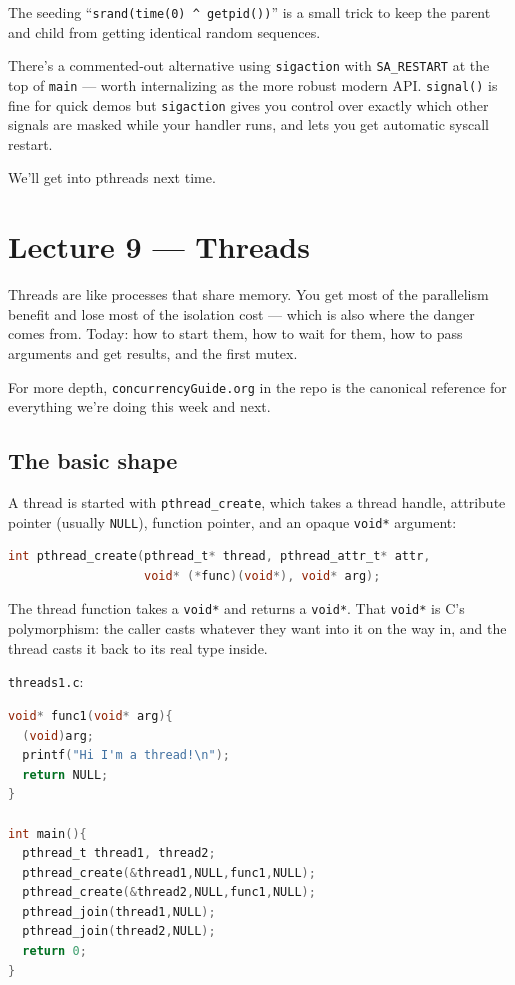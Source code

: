 \documentclass[11pt]{article}
\begin{document}
The seeding ``\texttt{srand(time(0) \^{} getpid())}'' is a small
trick to keep the parent and child from getting identical random
sequences.

There's a commented-out alternative using \texttt{sigaction} with
\texttt{SA\_RESTART} at the top of \texttt{main} --- worth
internalizing as the more robust modern API. \texttt{signal()} is
fine for quick demos but \texttt{sigaction} gives you control over
exactly which other signals are masked while your handler runs, and
lets you get automatic syscall restart.

We'll get into pthreads next time.

\section{Lecture 9 --- Threads}

Threads are like processes that share memory. You get most of the
parallelism benefit and lose most of the isolation cost --- which is
also where the danger comes from. Today: how to start them, how to
wait for them, how to pass arguments and get results, and the first
mutex.

For more depth, \texttt{concurrencyGuide.org} in the repo is the
canonical reference for everything we're doing this week and next.

\subsection*{The basic shape}

A thread is started with \texttt{pthread\_create}, which takes a
thread handle, attribute pointer (usually \texttt{NULL}), function
pointer, and an opaque \texttt{void*} argument:

\begin{lstlisting}[language=C]
int pthread_create(pthread_t* thread, pthread_attr_t* attr,
                   void* (*func)(void*), void* arg);
\end{lstlisting}

The thread function takes a \texttt{void*} and returns a
\texttt{void*}. That \texttt{void*} is C's polymorphism: the caller
casts whatever they want into it on the way in, and the thread casts
it back to its real type inside.

\texttt{threads1.c}:

\begin{lstlisting}[language=C]
void* func1(void* arg){
  (void)arg;
  printf("Hi I'm a thread!\n");
  return NULL;
}

int main(){
  pthread_t thread1, thread2;
  pthread_create(&thread1,NULL,func1,NULL);
  pthread_create(&thread2,NULL,func1,NULL);
  pthread_join(thread1,NULL);
  pthread_join(thread2,NULL);
  return 0;
}
\end{lstlisting}
\end{document}
